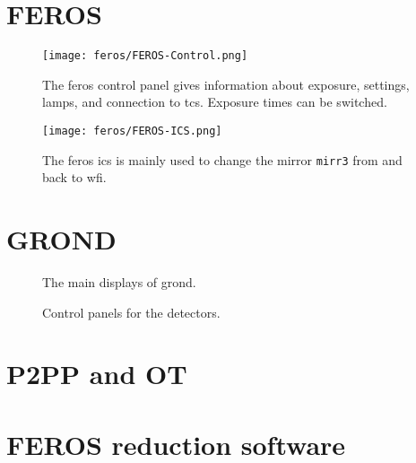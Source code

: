\documentclass[11pt,fleqn]{book} %
\begin{document}
\section{FEROS}

\begin{figure}[!ht]
\centering
\texttt{[image: feros/FEROS-Control.png]}
\caption[FEROS control panel]{The \gls{feros} control panel gives information
about exposure, settings, lamps, and connection to \gls{tcs}.  Exposure times
can be switched.}
\label{fig:feroscon}
\end{figure}

\begin{figure}[!ht]
\centering
\texttt{[image: feros/FEROS-ICS.png]}
\caption[FEROS instrument control software panel]{The \gls{feros} \gls{ics} is mainly used to change the mirror 
\texttt{mirr3} from and back to \gls{wfi}.}
\label{fig:ferosics}
\end{figure}


\section{GROND}

\begin{figure}[!ht]
\centering
{}\hfill
{}
\caption{The main displays of \gls{grond}.}
\label{fig:grondmain}
\end{figure}

\begin{figure}[!ht]
\centering
{}\hfill
{}
\caption{Control panels for the detectors.}
\label{fig:gronddet}
\end{figure}



\section{P2PP and OT}

\section{FEROS reduction software}
\end{document}

